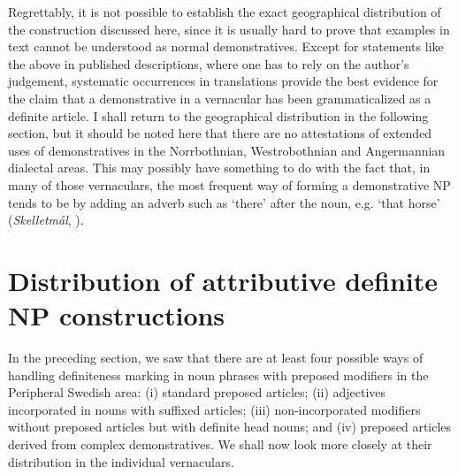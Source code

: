 
Regrettably, it is not possible to establish the exact geographical distribution of the construction discussed here, since it is usually hard to prove that examples in text cannot be understood as normal demonstratives. Except for statements like the above in published descriptions, where one has to rely on the author’s judgement, systematic occurrences in translations provide the best evidence for the claim that a demonstrative in a vernacular has been grammaticalized as a definite article. I shall return to the geographical distribution in the following section, but it should be noted here that there are no attestations of extended uses of demonstratives in the Norrbothnian, Westrobothnian and Angermannian dialectal areas. This may possibly have something to do with the fact that, in many of those vernaculars, the most frequent way of forming a demonstrative NP tends to be by adding an adverb such as  ‘there’ after the noun, e.g.  ‘that horse’ (\textit{Skelletmål}, \citet[41]{Marklund1976}).


\section{\rmfamily Distribution of attributive definite NP constructions}
\label{bkm:Ref141070030}
In the preceding section, we saw that there are at least four possible ways of handling definiteness marking in noun phrases with preposed modifiers in the Peripheral Swedish area: (i) standard preposed articles; (ii) adjectives incorporated in nouns with suffixed articles; (iii) non-incorporated modifiers without preposed articles but with definite head nouns; and (iv) preposed articles derived from complex demonstratives.  We shall now look more closely at their distribution in the individual vernaculars. 


